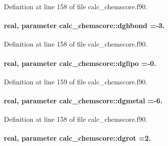 Definition at line 158 of file calc\-\_\-chemscore.\-f90.

\hypertarget{classcalc__chemscore_a07cb5cb9cd2c15d9b1339e4212224011}{
\paragraph[{dghbond}]{\setlength{\rightskip}{0pt plus 5cm}real, parameter calc\-\_\-chemscore\-::dghbond =-\/3.}}\label{classcalc__chemscore_a07cb5cb9cd2c15d9b1339e4212224011}


Definition at line 158 of file calc\-\_\-chemscore.\-f90.

\hypertarget{classcalc__chemscore_a56c59d883c700c67655d80f08f9de928}{
\paragraph[{dglipo}]{\setlength{\rightskip}{0pt plus 5cm}real, parameter calc\-\_\-chemscore\-::dglipo =-\/0.}}\label{classcalc__chemscore_a56c59d883c700c67655d80f08f9de928}


Definition at line 159 of file calc\-\_\-chemscore.\-f90.

\hypertarget{classcalc__chemscore_a8e30cdec6eac436e2c66c8042077f8fd}{
\paragraph[{dgmetal}]{\setlength{\rightskip}{0pt plus 5cm}real, parameter calc\-\_\-chemscore\-::dgmetal =-\/6.}}\label{classcalc__chemscore_a8e30cdec6eac436e2c66c8042077f8fd}


Definition at line 158 of file calc\-\_\-chemscore.\-f90.

\hypertarget{classcalc__chemscore_a2ffd6fa0a78e73647da9a04acf90124e}{
\paragraph[{dgrot}]{\setlength{\rightskip}{0pt plus 5cm}real, parameter calc\-\_\-chemscore\-::dgrot =2.}}\label{classcalc__chemscore_a2ffd6fa0a78e73647da9a04acf90124e}


